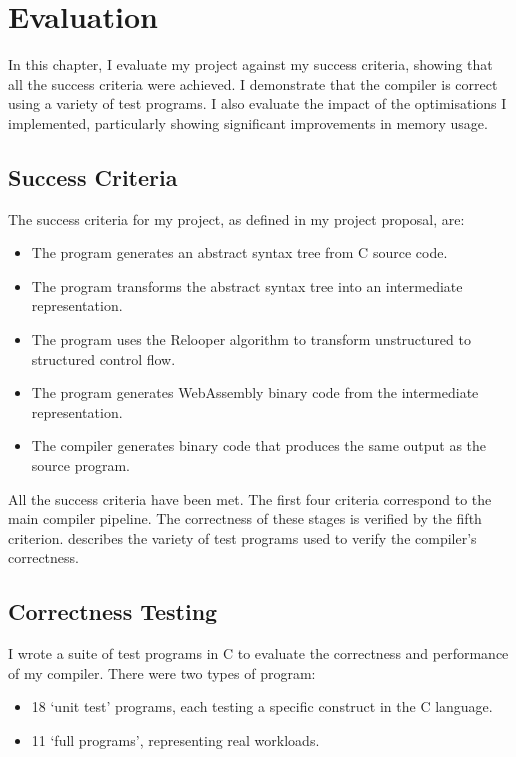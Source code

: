 \documentclass[00-main.tex]{subfiles}
\begin{document}
\chapter{Evaluation}

\newcommand{\IncludeStackPlot}[1]{\resizebox{0.98\textwidth}{!}{}}

In this chapter, I evaluate my project against my success criteria, showing that all the success criteria were achieved.
I demonstrate that the compiler is correct using a variety of test programs.
I also evaluate the impact of the optimisations I implemented, particularly showing significant improvements in memory usage.


\section{Success Criteria}\label{sec:eval:success criteria}

The success criteria for my project, as defined in my project proposal, are:
\begin{itemize}[nosep, itemsep=2pt]
\item The program generates an abstract syntax tree from C source code.
\item The program transforms the abstract syntax tree into an intermediate representation.
\item The program uses the Relooper algorithm to transform unstructured to structured control
flow.
\item The program generates WebAssembly binary code from the intermediate representation.
\item The compiler generates binary code that produces the same output as the source program.
\end{itemize}

All the success criteria have been met.
The first four criteria correspond to the main compiler pipeline.
The correctness of these stages is verified by the fifth criterion.
 describes the variety of test programs used to verify the compiler's correctness.


\section{Correctness Testing}\label{sec:eval:correctness testing}

I wrote a suite of test programs in C to evaluate the correctness and performance of my compiler.
There were two types of program:
\begin{itemize}[nosep, itemsep=2pt]
\item 18 `unit test' programs, each testing a specific construct in the C language.
\item 11 `full programs', representing real workloads.
\end{itemize}
\end{document}
